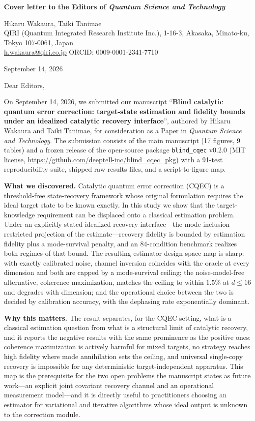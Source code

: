 \documentclass[11pt,a4paper]{article}
\begin{document}
\textbf{Cover letter to the Editors of \emph{Quantum Science and Technology}}

\vspace{0.3cm}
Hikaru Wakaura, Taiki Tanimae\\
QIRI (Quantum Integrated Research Institute Inc.), 1-16-3, Akasaka, Minato-ku, Tokyo 107-0061, Japan\\
\href{mailto:h.wakaura@qiri.co.jp}{h.wakaura@qiri.co.jp} \quad ORCID: 0009-0001-2341-7710

\vspace{0.2cm}
September 14, 2026

\vspace{0.3cm}
Dear Editors,

On September 14, 2026, we submitted our manuscript ``\textbf{Blind catalytic quantum error correction: target-state estimation and fidelity bounds under an idealized catalytic recovery interface}'', authored by Hikaru Wakaura and Taiki Tanimae, for consideration as a Paper in \emph{Quantum Science and Technology}.
The submission consists of the main manuscript (17 figures, 9 tables) and a frozen release of the open-source package \texttt{blind\_cqec} v0.2.0 (MIT license, \url{https://github.com/deeptell-inc/blind_cqec_pkg}) with a 91-test reproducibility suite, shipped raw results files, and a script-to-figure map.

\textbf{What we discovered.}
Catalytic quantum error correction (CQEC) is a threshold-free state-recovery framework whose original formulation requires the ideal target state to be known exactly.
In this study we show that the target-knowledge requirement can be displaced onto a classical estimation problem.
Under an explicitly stated idealized recovery interface---the mode-inclusion-restricted projection of the estimate---recovery fidelity is bounded by estimation fidelity plus a mode-survival penalty, and an 84-condition benchmark realizes both regimes of that bound.
The resulting estimator design-space map is sharp: with exactly calibrated noise, channel inversion coincides with the oracle at every dimension and both are capped by a mode-survival ceiling; the noise-model-free alternative, coherence maximization, matches the ceiling to within $1.5\%$ at $d \leq 16$ and degrades with dimension; and the operational choice between the two is decided by calibration accuracy, with the dephasing rate exponentially dominant.

\textbf{Why this matters.}
The result separates, for the CQEC setting, what is a classical estimation question from what is a structural limit of catalytic recovery, and it reports the negative results with the same prominence as the positive ones: coherence maximization is actively harmful for mixed targets, no strategy reaches high fidelity where mode annihilation sets the ceiling, and universal single-copy recovery is impossible for any deterministic target-independent apparatus.
This map is the prerequisite for the two open problems the manuscript states as future work---an explicit joint covariant recovery channel and an operational measurement model---and it is directly useful to practitioners choosing an estimator for variational and iterative algorithms whose ideal output is unknown to the correction module.
\end{document}
